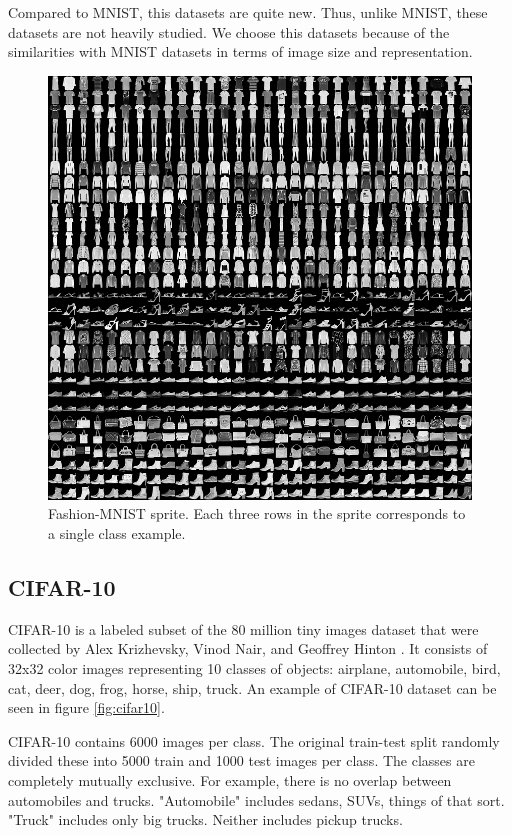 Compared to MNIST, this datasets are quite new. Thus, unlike MNIST, these datasets are not heavily studied. We choose this datasets because of the similarities with MNIST datasets in terms of image size and representation. 
\begin{figure}[h]
	\includegraphics[scale=0.3]{figures/fashion-mnist}
	\centering
	\caption{Fashion-MNIST sprite. Each three rows in the sprite corresponds to a single class example. \cite{xiao2017/online}}
	\label{fig:fashionmnist}
\end{figure}

\subsection{CIFAR-10}
CIFAR-10 is a labeled subset of the 80 million tiny images dataset that were collected by Alex Krizhevsky, Vinod Nair, and Geoffrey Hinton \cite{krizhevsky2009learning}. It consists of 32x32 color images representing 10 classes of objects: airplane, automobile, bird, cat, deer, dog, frog, horse, ship, truck. An example of CIFAR-10 dataset can be seen in figure \ref{fig:cifar10}.

CIFAR-10 contains 6000 images per class. The original train-test split randomly divided these into 5000 train and 1000 test images per class.
The classes are completely mutually exclusive. For example, there is no overlap between automobiles and trucks. "Automobile" includes sedans, SUVs, things of that sort. "Truck" includes only big trucks. Neither includes pickup trucks.



